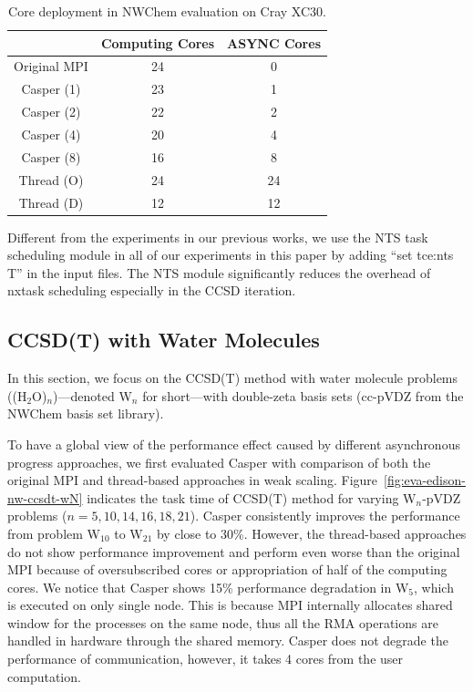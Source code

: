 \begin{table}%
\begin{center}
\caption{Core deployment in NWChem evaluation on Cray XC30.}\label{tab:eva-csp-nwcore}
\begin{tabular}{|c|cc|}
\hline
& Computing Cores & ASYNC Cores \\
\hline
Original MPI & 24 & 0 \\
Casper (1) & 23 & 1 \\
Casper (2) & 22 & 2 \\
Casper (4) & 20 & 4 \\
Casper (8) & 16 & 8 \\
Thread (O) & 24 & 24 \\
Thread (D) & 12 & 12 \\
\hline
\end{tabular}
\end{center}
\end{table}

Different from the experiments in our previous works, we use the NTS task
scheduling module in all of our experiments in this paper by adding
``set tce:nts T'' in the input files. The NTS module significantly reduces
the overhead of nxtask scheduling especially in the CCSD iteration.


\subsection{CCSD(T) with Water Molecules}\label{sec:eva-nwchem-basic-ccsdt}

In this section, we focus on the CCSD(T) method with water molecule
problems ((H$_2$O)$_n$)---denoted W$_n$ for short---with double-zeta
basis sets (cc-pVDZ from the NWChem basis set library).

To have a global view of the performance effect caused by different
asynchronous progress approaches, we first evaluated Casper with
comparison of both the original MPI and thread-based approaches in
weak scaling. Figure~\ref{fig:eva-edison-nw-ccsdt-wN} indicates the task
time of CCSD(T) method for varying W$_n$-pVDZ problems
($n=5, 10, 14, 16, 18, 21$). Casper consistently improves the performance
from problem W$_{10}$ to W$_{21}$ by close to 30\%. However, the
thread-based approaches do not show performance improvement and perform
even worse than the original MPI because of oversubscribed cores or
appropriation of half of the computing cores. We notice that Casper
shows 15\% performance degradation in W$_{5}$, which is executed on only
single node. This is because MPI internally allocates shared window for
the processes on the same node, thus all the RMA operations are handled
in hardware through the shared memory. Casper does not degrade the
performance of communication, however, it takes 4 cores from the user
computation.

